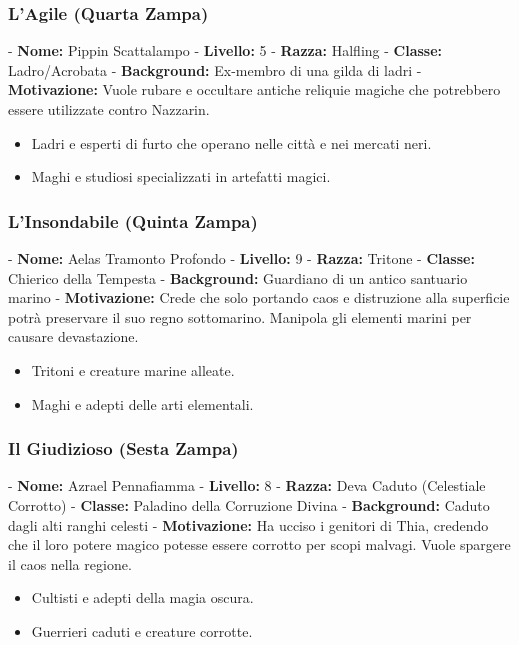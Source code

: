 \documentclass{article}
\begin{document}
              \subsubsection{ L'Agile (Quarta Zampa)}
   - \textbf{Nome:} Pippin Scattalampo
   - \textbf{Livello:} 5
   - \textbf{Razza:} Halfling
   - \textbf{Classe:} Ladro/Acrobata
   - \textbf{Background:} Ex-membro di una gilda di ladri
   - \textbf{Motivazione:} Vuole rubare e occultare antiche reliquie magiche che potrebbero essere utilizzate contro Nazzarin.
   \begin{itemize}
    \item Ladri e esperti di furto che operano nelle città e nei mercati neri.
    \item Maghi e studiosi specializzati in artefatti magici.
\end{itemize}
              \subsubsection{ L'Insondabile (Quinta Zampa)}
   - \textbf{Nome:} Aelas Tramonto Profondo
   - \textbf{Livello:} 9
   - \textbf{Razza:} Tritone
   - \textbf{Classe:} Chierico della Tempesta
   - \textbf{Background:} Guardiano di un antico santuario marino
   - \textbf{Motivazione:} Crede che solo portando caos e distruzione alla superficie potrà preservare il suo regno sottomarino. Manipola gli elementi marini per causare devastazione.
   \begin{itemize}
    \item Tritoni e creature marine alleate.
    \item Maghi e adepti delle arti elementali.
\end{itemize}

              \subsubsection{ Il Giudizioso (Sesta Zampa)}
   - \textbf{Nome:} Azrael Pennafiamma
   - \textbf{Livello:} 8
   - \textbf{Razza:} Deva Caduto (Celestiale Corrotto)
   - \textbf{Classe:} Paladino della Corruzione Divina
   - \textbf{Background:} Caduto dagli alti ranghi celesti
   - \textbf{Motivazione:} Ha ucciso i genitori di Thia, credendo che il loro potere magico potesse essere corrotto per scopi malvagi. Vuole spargere il caos nella regione.
   \begin{itemize}
    \item Cultisti e adepti della magia oscura.
    \item Guerrieri caduti e creature corrotte.
\end{itemize}
\end{document}
